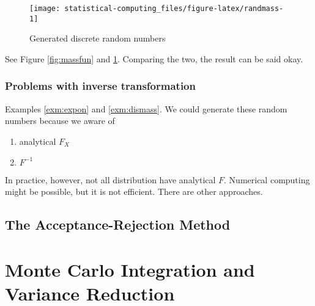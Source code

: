 \documentclass[]{book}
\providecommand{\tightlist}{%
  \setlength{\itemsep}{0pt}\setlength{\parskip}{0pt}}
\theoremstyle{definition}
\theoremstyle{definition}
\theoremstyle{definition}
\theoremstyle{remark}
\begin{document}
\begin{figure}[H]

{\centering \texttt{[image: statistical-computing\_files/figure-latex/randmass-1]} 

}

\caption{Generated discrete random numbers}\label{fig:randmass}
\end{figure}

See Figure \ref{fig:massfun} and \ref{fig:randmass}. Comparing the two,
the result can be said okay.

\subsection{Problems with inverse
transformation}\label{problems-with-inverse-transformation}

Examples \ref{exm:expon} and \ref{exm:dismass}. We could generate these
random numbers because we aware of

\begin{enumerate}
\def\labelenumi{\arabic{enumi}.}
\tightlist
\item
  analytical \(F_X\)
\item
  \(F^{-1}\)
\end{enumerate}

In practice, however, not all distribution have analytical \(F\).
Numerical computing might be possible, but it is not efficient. There
are other approaches.

\section{The Acceptance-Rejection
Method}\label{the-acceptance-rejection-method}

\chapter{Monte Carlo Integration and Variance Reduction}\label{mcint}


\end{document}
